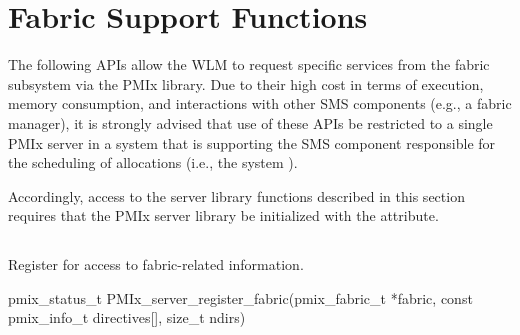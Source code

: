 


\section{Fabric Support Functions}

The following \acp{API} allow the \ac{WLM} to request specific services from the fabric subsystem via the \ac{PMIx} library. Due to their high cost in terms of execution, memory consumption, and interactions with other \ac{SMS} components (e.g., a fabric manager), it is strongly advised that use of these \acp{API} be restricted to a single \ac{PMIx} server in a system that is supporting the \ac{SMS} component responsible for the scheduling of allocations (i.e., the system ).

Accordingly, access to the server library functions described in this section requires that the \ac{PMIx} server library be initialized with the  attribute.

\subsection{}

\summary

Register for access to fabric-related information.

\format

\cspecificstart
\begin{codepar}
pmix_status_t
PMIx_server_register_fabric(pmix_fabric_t *fabric,
                            const pmix_info_t directives[],
                            size_t ndirs)
\end{codepar}
\cspecificend

